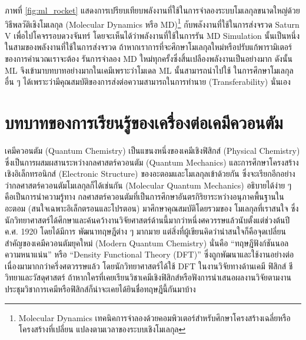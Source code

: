 ภาพที่ \ref{fig:ml_rocket} แสดงการเปรียบเทียบพลังงานที่ใช้ในการจำลองระบบโมเลกุลขนาดใหญ่ด้วยวิธีพลวัติเชิงโมเลกุล (Molecular 
Dynamics หรือ MD)\footnote{Molecular Dynamics เทคนิคการจำลองด้วยคอมพิวเตอร์สำหรับศึกษาโครงสร้างเฉลี่ยหรือโครงสร้างที่เปลี่ยน%
แปลงตามเวลาของระบบเชิงโมเลกุล} กับพลังงานที่ใช้ในการส่งจรวด Saturn V เพื่อไปโคจรรอบดวงจันทร์ โดยจะเห็นได้ว่าพลังงานที่ใช้ในการรัน MD 
Simulation นั้นเป็นหนึ่งในสามของพลังงานที่ใช้ในการส่งจรวด ถ้าหากเราการที่จะศึกษาโมเลกุลใหม่หรือปรับแก้พารามิเตอร์ของการคำนวณเราจะต้อง%
รันการจำลอง MD ใหม่ทุกครั้งซึ่งสิ้นเปลืองพลังงานเป็นอย่างมาก ดังนั้น ML จึงเข้ามาบทบาทอย่างมากในเคมีเพราะว่าโมเดล ML นั้นสามารถนำไปใช้%
ในการศึกษาโมเลกุลอื่น ๆ ได้เพราะว่ามีคุณสมบัติของการส่งต่อความสามารถในการทำนาย (Transferability) นั่นเอง

\section{บทบาทของการเรียนรู้ของเครื่องต่อเคมีควอนตัม}
\label{sec:ml_in_qm}

เคมีควอนตัม (Quantum Chemistry) เป็นแขนงหนึ่งของเคมีเชิงฟิสิกส์ (Physical Chemistry) ซึ่งเป็นการผสมผสานระหว่างกลศาสตร์ควอนตัม 
(Quantum Mechanics) และการศึกษาโครงสร้างเชิงอิเล็กทรอนิกส์ (Electronic Structure) ของอะตอมและโมเลกุลเข้าด้วยกัน 
ซึ่งจะเรียกอีกอย่างว่ากลศาสตร์ควอนตัมโมเลกุลก็ได้เช่นกัน (Molecular Quantum Mechanics) อธิบายได้ง่าย ๆ คือเป็นการนำความรู้ทาง%
กลศาสตร์ควอนตัมที่เป็นการศึกษาอันตรกิริยาระหว่างอนุภาคพื้นฐานในอะตอม (สนใจเฉพาะอิเล็กตรอนและโปรตอน) มาศึกษาคุณสมบัติโดยรวมของ%
โมเลกุลที่เราสนใจ ซึ่งนักวิทยาศาสตร์ได้ศึกษาและค้นคว้างานวิจัยศาสตร์ด้านนี้มากว่าหนึ่งศควรรษแล้วนับตั้งแต่ช่วงต้นปี ค.ศ. 1920 โดยได้มีการ%
พัฒนาทฤษฎีต่าง ๆ มากมาย แต่สิ่งที่ผู้เขียนคิดว่าน่าสนใจก็คือจุดเปลี่ยนสำคัญของเคมีควอนตัมยุคใหม่ (Modern Quantum Chemistry) นั่นคือ 
\enquote{ทฤษฎีฟังก์ชันนอลความหนาแน่น} หรือ \enquote{Density Functional Theory (DFT)}\autocite{kohn1996} 
ซึ่งถูกพัฒนาและใช้งานอย่างต่อเนื่องมามากกว่าครึ่งศตวรรษแล้ว โดยนักวิทยาศาสตร์ได้ใช้ DFT ในงานวิจัยทางด้านเคมี ฟิสิกส์ ชีวิทยาและวัสดุศาสตร์ 
ถ้าหากใครที่เคยเรียนวิชาเคมีเชิงฟิสิกส์หรือฟังการนำเสนอผลงานวิจัยตามงานประชุมวิชาการเคมีหรือฟิสิกส์ก็น่าจะเคยได้ยินชื่อทฤษฎีนี้กันมาบ้าง 

